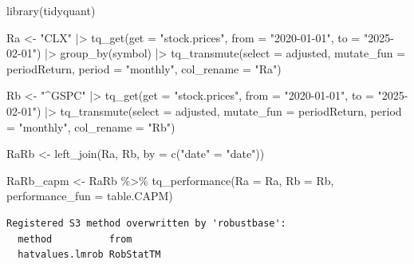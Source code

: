 \documentclass[
  letterpaper,
  DIV=11,
  numbers=noendperiod]{scrartcl}
\newenvironment{Shaded}{\begin{snugshade}}{\end{snugshade}}
\newcommand{\AttributeTok}[1]{\textcolor[rgb]{0.40,0.45,0.13}{#1}}
\newcommand{\FunctionTok}[1]{\textcolor[rgb]{0.28,0.35,0.67}{#1}}
\newcommand{\NormalTok}[1]{\textcolor[rgb]{0.00,0.23,0.31}{#1}}
\newcommand{\OtherTok}[1]{\textcolor[rgb]{0.00,0.23,0.31}{#1}}
\newcommand{\SpecialCharTok}[1]{\textcolor[rgb]{0.37,0.37,0.37}{#1}}
\newcommand{\StringTok}[1]{\textcolor[rgb]{0.13,0.47,0.30}{#1}}
\begin{document}
\begin{Shaded}
\begin{Highlighting}[]
\FunctionTok{library}\NormalTok{(tidyquant)}

\NormalTok{Ra }\OtherTok{\textless{}{-}} \StringTok{"CLX"} \SpecialCharTok{|\textgreater{}}
    \FunctionTok{tq\_get}\NormalTok{(}\AttributeTok{get  =} \StringTok{"stock.prices"}\NormalTok{,}
           \AttributeTok{from =} \StringTok{"2020{-}01{-}01"}\NormalTok{,}
           \AttributeTok{to   =} \StringTok{"2025{-}02{-}01"}\NormalTok{) }\SpecialCharTok{|\textgreater{}}
    \FunctionTok{group\_by}\NormalTok{(symbol) }\SpecialCharTok{|\textgreater{}}
    \FunctionTok{tq\_transmute}\NormalTok{(}\AttributeTok{select     =}\NormalTok{ adjusted, }
                 \AttributeTok{mutate\_fun =}\NormalTok{ periodReturn, }
                 \AttributeTok{period     =} \StringTok{"monthly"}\NormalTok{, }
                 \AttributeTok{col\_rename =} \StringTok{"Ra"}\NormalTok{)}


\NormalTok{Rb }\OtherTok{\textless{}{-}} \StringTok{"\^{}GSPC"} \SpecialCharTok{|\textgreater{}}
    \FunctionTok{tq\_get}\NormalTok{(}\AttributeTok{get  =} \StringTok{"stock.prices"}\NormalTok{,}
           \AttributeTok{from =} \StringTok{"2020{-}01{-}01"}\NormalTok{,}
           \AttributeTok{to   =} \StringTok{"2025{-}02{-}01"}\NormalTok{) }\SpecialCharTok{|\textgreater{}}
    \FunctionTok{tq\_transmute}\NormalTok{(}\AttributeTok{select     =}\NormalTok{ adjusted, }
                 \AttributeTok{mutate\_fun =}\NormalTok{ periodReturn, }
                 \AttributeTok{period     =} \StringTok{"monthly"}\NormalTok{, }
                 \AttributeTok{col\_rename =} \StringTok{"Rb"}\NormalTok{)}

\NormalTok{RaRb }\OtherTok{\textless{}{-}} \FunctionTok{left\_join}\NormalTok{(Ra, Rb, }\AttributeTok{by =} \FunctionTok{c}\NormalTok{(}\StringTok{"date"} \OtherTok{=} \StringTok{"date"}\NormalTok{))}


\NormalTok{RaRb\_capm }\OtherTok{\textless{}{-}}\NormalTok{ RaRb }\SpecialCharTok{\%\textgreater{}\%}
    \FunctionTok{tq\_performance}\NormalTok{(}\AttributeTok{Ra =}\NormalTok{ Ra, }
                   \AttributeTok{Rb =}\NormalTok{ Rb, }
                   \AttributeTok{performance\_fun =}\NormalTok{ table.CAPM)}
\end{Highlighting}
\end{Shaded}

\begin{verbatim}
Registered S3 method overwritten by 'robustbase':
  method          from     
  hatvalues.lmrob RobStatTM
\end{verbatim}
\end{document}
